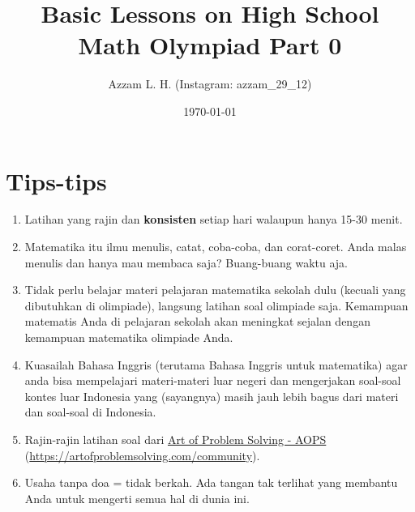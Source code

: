 \title{Basic Lessons on High School Math Olympiad Part 0} 
\date{\today}
\author{Azzam L. H. (Instagram: azzam\_29\_12)}
\maketitle
\renewcommand*\contentsname{Daftar Isi}
\tableofcontents
 
\section{Tips-tips}
	\begin{enumerate}
	    \item Latihan yang rajin dan \textbf{konsisten} setiap hari walaupun hanya 15-30 menit.
	    \item Matematika itu ilmu menulis, catat, coba-coba, dan corat-coret. Anda malas menulis dan hanya mau membaca saja? Buang-buang waktu aja.
	    \item Tidak perlu belajar materi pelajaran matematika sekolah dulu (kecuali yang dibutuhkan di olimpiade), langsung latihan soal olimpiade saja. Kemampuan matematis Anda di pelajaran sekolah akan meningkat sejalan dengan kemampuan matematika olimpiade Anda.
	    \item Kuasailah Bahasa Inggris (terutama Bahasa Inggris untuk matematika) agar anda bisa mempelajari materi-materi luar negeri dan mengerjakan soal-soal kontes luar Indonesia yang (sayangnya) masih jauh lebih bagus dari materi dan soal-soal di Indonesia.
	    \item Rajin-rajin latihan soal dari \href{https://artofproblemsolving.com/community}{Art of Problem Solving - AOPS} (\href{https://artofproblemsolving.com/community}{https://artofproblemsolving.com/community}).
	    \item Usaha tanpa doa = tidak berkah. Ada tangan tak terlihat yang membantu Anda untuk mengerti semua hal di dunia ini.

	\end{enumerate}
	




